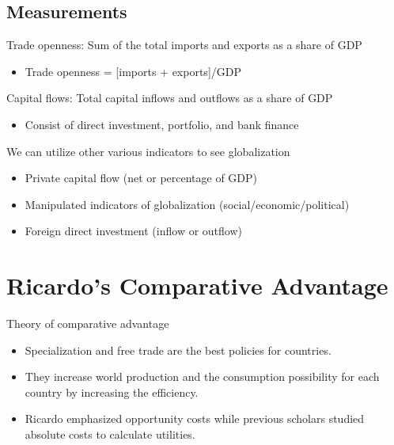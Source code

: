 \documentclass[
]{book}
\providecommand{\tightlist}{%
  \setlength{\itemsep}{0pt}\setlength{\parskip}{0pt}}
\begin{document}
\hypertarget{measurements}{%
\subsection{Measurements}\label{measurements}}

Trade openness: Sum of the total imports and exports as a share of GDP

\begin{itemize}
\tightlist
\item
  Trade openness = {[}imports + exports{]}/GDP
\end{itemize}

Capital flows: Total capital inflows and outflows as a share of GDP

\begin{itemize}
\tightlist
\item
  Consist of direct investment, portfolio, and bank finance
\end{itemize}

We can utilize other various indicators to see globalization

\begin{itemize}
\item
  Private capital flow (net or percentage of GDP)
\item
  Manipulated indicators of globalization (social/economic/political)
\item
  Foreign direct investment (inflow or outflow)
\end{itemize}

\hypertarget{ricardos-comparative-advantage}{%
\section{Ricardo's Comparative Advantage}\label{ricardos-comparative-advantage}}

Theory of comparative advantage

\begin{itemize}
\item
  Specialization and free trade are the best policies for countries.
\item
  They increase world production and the consumption possibility for each country by increasing the efficiency.
\item
  Ricardo emphasized opportunity costs while previous scholars studied absolute costs to calculate utilities.
\end{itemize}
\end{document}
